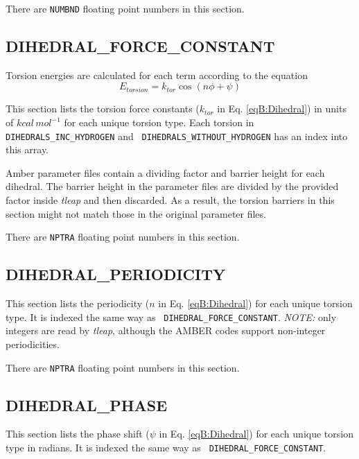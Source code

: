 
\noindent There are {\tt NUMBND} floating point numbers in this section.

\subsection*{DIHEDRAL\_FORCE\_CONSTANT}

Torsion energies are calculated for each term according to the equation
\begin{equation}
   E_{torsion} = k_{tor} \cos \left ( n \phi + \psi \right )
   \label{eqB:Dihedral}
\end{equation}

\sloppy
This section lists the torsion force constants ($k_{tor}$ in Eq.
\ref{eqB:Dihedral}) in units of $kcal\, mol^{-1}$ for each unique torsion type.
Each torsion in {\tt DIHEDRALS\_INC\_HYDROGEN} and {\tt
DIHEDRALS\_WITHOUT\_HYDROGEN} has an index into this array.

Amber parameter files contain a dividing factor and barrier height for each
dihedral. The barrier height in the parameter files are divided by the provided
factor inside \emph{tleap} and then discarded. As a result, the torsion barriers
in this section might not match those in the original parameter files.


\noindent There are {\tt NPTRA} floating point numbers in this section.

\subsection*{DIHEDRAL\_PERIODICITY}

This section lists the periodicity ($n$ in Eq. \ref{eqB:Dihedral}) for each
unique torsion type. It is indexed the same way as {\tt
DIHEDRAL\_FORCE\_CONSTANT}. \emph{NOTE:} only integers are read by
\emph{tleap}, although the AMBER codes support non-integer periodicities.


\noindent There are {\tt NPTRA} floating point numbers in this section.

\subsection*{DIHEDRAL\_PHASE}

This section lists the phase shift ($\psi$ in Eq. \ref{eqB:Dihedral}) for each
unique torsion type in radians. It is indexed the same way as {\tt
DIHEDRAL\_FORCE\_CONSTANT}.

